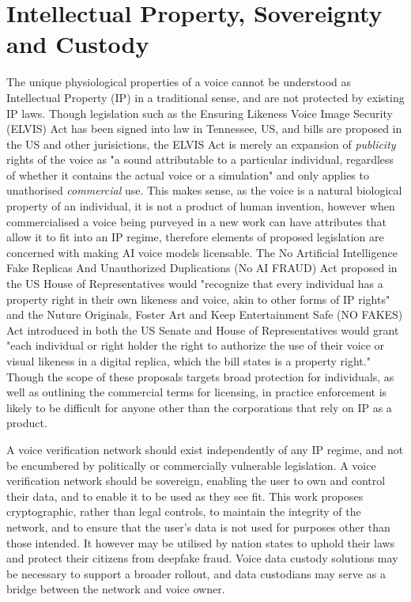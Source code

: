 \documentclass[11pt,a4paper]{article}
\begin{document}
\section{Intellectual Property, Sovereignty and Custody}
\label{sec:conclusion}
The unique physiological properties of a voice cannot be understood as Intellectual Property (IP) in a traditional sense, and are not protected by existing IP laws.
Though legislation such as the Ensuring Likeness Voice Image Security (ELVIS) Act \cite{elvis2024act} has been signed into law in Tennessee, US, and bills are proposed in the US and other jurisictions, the ELVIS Act is merely an expansion of \textit{publicity} rights of the voice as "a sound attributable to a particular individual, regardless of whether it contains the actual voice or a simulation" and only applies to unathorised \textit{commercial} use.
This makes sense, as the voice is a natural biological property of an individual, it is not a product of human invention, however when commercialised a voice being purveyed in a new work can have attributes that allow it to fit into an IP regime, therefore elements of proposed legislation are concerned with making AI voice models licensable.
The No Artificial Intelligence Fake Replicas And Unauthorized Duplications (No AI FRAUD) Act \cite{noaifraud2024act} proposed in the US House of Representatives would "recognize that every individual has a property right in their own likeness and voice, akin to other forms of IP rights" and the Nuture Originals, Foster Art and Keep Entertainment Safe (NO FAKES) Act \cite{nofakes2024act} introduced in both the US Senate and House of Representatives would grant "each individual or right holder the right to authorize the use of their voice or visual likeness in a digital replica, which the bill states is a property right."
Though the scope of these proposals targets broad protection for individuals, as well as outlining the commercial terms for licensing, in practice enforcement is likely to be difficult for anyone other than the corporations that rely on IP as a product.

A voice verification network should exist independently of any IP regime, and not be encumbered by politically or commercially vulnerable legislation.
A voice verification network should be sovereign, enabling the user to own and control their data, and to enable it to be used as they see fit.
This work proposes cryptographic, rather than legal controls, to maintain the integrity of the network, and to ensure that the user's data is not used for purposes other than those intended.
It however may be utilised by nation states to uphold their laws and protect their citizens from deepfake fraud.
Voice data custody solutions may be necessary to support a broader rollout, and data custodians may serve as a bridge between the network and voice owner.
\end{document}
